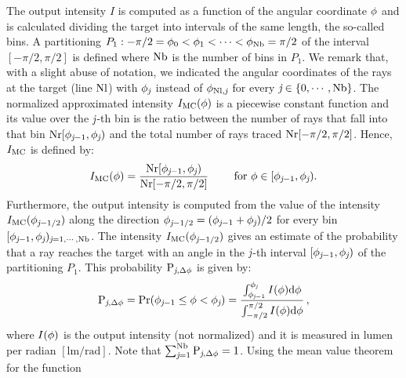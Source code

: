 The output intensity $I$ is computed as a function of the angular coordinate $\phi$ and is calculated dividing the target into intervals of the same length, the so-called bins. A partitioning 
$P_1: -\pi/2 = \phi_{0}<\phi_{1}<\cdots <\phi_{\textrm{Nb}}=\pi/2$ of the interval $[-\pi/2, \pi/2]$ is defined where $\textrm{Nb}$ is the number of bins in $P_1$.
We remark that, with a slight abuse of notation, we indicated the angular coordinates of the rays at the target (line $\textrm{Nl}$) with $\phi_{\textit{j}}$ instead of $\phi_{\textrm{Nl},\textit{j}}$ for every $\textit{j}\in\{0, \cdots, \textrm{Nb}\}$.
The normalized approximated intensity $I_{\textrm{MC}}(\phi)$ is a piecewise constant function and its value over the $\textit{j}$-th bin is the ratio between the number of rays that fall into that bin
$\textrm{Nr}[\phi_{\textit{j}-1},\phi_{\textit{j}})$ and the total number of rays traced $\textrm{Nr}[-\pi/2, \pi/2]$.
Hence, $I_{\textrm{MC}}$ is defined by:
\begin{equation} \label{g_mc}
I_{\textrm{MC}}(\phi) = \frac{\textrm{Nr}[\phi_{\textit{j}-1},\phi_{\textit{j}})}{\textrm{Nr}[-\pi/2, \pi/2]} \qquad \mbox{ for } \phi\in[\phi_{\textit{j}-1}, \phi_{\textit{j}}).
\end{equation}
Furthermore, the output intensity is computed from the value of the intensity $I_{\textrm{MC}}(\phi_{\textit{j}-1/2})$ along the direction $\phi_{\textit{j}-1/2}=(\phi_{\textit{j}-1}+
\phi_{\textit{j}})/2$ for every bin $[\phi_{\textit{j}-1},\phi_{\textit{j}})_{\textit{j} = 1, \cdots, \textrm{Nb}}$.
 The intensity $I_{\textrm{MC}}(\phi_{\textit{j}-1/2})$ gives an estimate of the probability that a ray reaches the target with an angle in the $\textit{j}$-th interval 
$[\phi_{\textit{j}-1}, \phi_{\textit{j}})$ of the partitioning $P_1$. This probability $\textrm{P}_{\textit{j}, \Delta\phi}$ is given by:
\begin{equation}\label{eq:probability}
\textrm{P}_{\textit{j}, \Delta\phi} = \Pr(\phi_{\textit{j}-1}\leq\phi<\phi_{\textit{j}})= 
\frac{\int_{\phi_{\textit{j}-1}}^{\phi_{\textit{j}}} I(\phi) \textrm{d}\phi}{\int_{-\pi/2}^{\pi/2}I(\phi) \textrm{d}\phi}\,,
\end{equation}
where $I(\phi)$ is the output intensity (not normalized) and it is measured in lumen per radian $[\textrm{lm}/\textrm{rad}]$.
Note that $\sum_{\textit{j}=1}^{\textrm{Nb}}\textrm{P}_{\textit{j}, \Delta\phi}=1$. Using the mean value theorem for the function 
